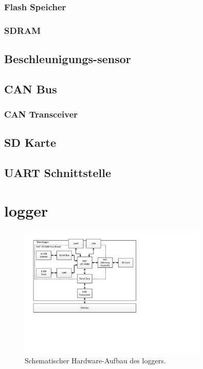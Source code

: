 \subsubsection{Flash Speicher}

\subsubsection{SDRAM}


\subsection{Beschleunigungs-\gls{sensor}}

\subsection{CAN Bus}

\subsubsection{CAN Transceiver}


\subsection{SD Karte}

\subsection{UART Schnittstelle}

\section{\gls{logger}}

\begin{figure}[H]
	\centering
		\includegraphics[width=0.8\textwidth]{images/visio/hardware_logger.pdf}
	\caption{Schematischer Hardware-Aufbau des \gls{logger}s.}
	\label{fig.hw_logger}
\end{figure}



